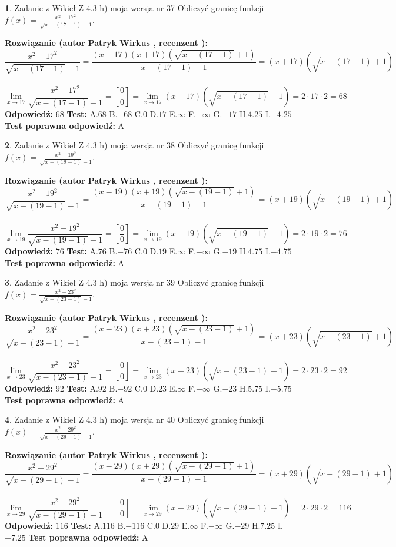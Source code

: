\documentclass[12pt, a4paper]{article}
\theoremstyle{definition} %
\newtheorem{zad}{}
\newcommand{\zadStart}[1]{\begin{zad}#1\newline}
\newcommand{\zadStop}{\end{zad}}
\newcommand{\rozwStart}[2]{\noindent \textbf{Rozwiązanie (autor #1 , recenzent #2): }\newline}
\newcommand{\rozwStop}{\newline}
\newcommand{\odpStart}{\noindent \textbf{Odpowiedź:}\newline}
\newcommand{\odpStop}{\newline}
\newcommand{\testStart}{\noindent \textbf{Test:}\newline}
\newcommand{\testStop}{\newline}
\newcommand{\kluczStart}{\noindent \textbf{Test poprawna odpowiedź:}\newline}
\newcommand{\kluczStop}{\newline}
\begin{document}
\zadStart{Zadanie z Wikieł Z 4.3 h) moja wersja nr 37}
Obliczyć granicę funkcji $f(x)=\frac{x^{2} - 17^{2}}{\sqrt{x-(17-1)}-1}$.
\zadStop
\rozwStart{Patryk Wirkus}{}
$$\frac{x^{2} - 17^{2}}{\sqrt{x-(17-1)}-1}=\frac{(x-17)(x+17)(\sqrt{x-(17-1)}+1)}{x-(17-1)-1}=(x+17)(\sqrt{x-(17-1)}+1)$$
\\
$$\lim\limits_{x\to 17}\frac{x^{2} - 17^{2}}{\sqrt{x-(17-1)}-1}=[\frac{0}{0}]=
\lim\limits_{x\to 17}(x+17)(\sqrt{x-(17-1)}+1) = 2\cdot17 \cdot 2 = 68$$
\rozwStop
\odpStart
$68$
\odpStop
\testStart
A.$68$
B.$-68$
C.$0$
D.$17$
E.$\infty$
F.$-\infty$
G.$-17$
H.$4.25$
I.$-4.25$
\testStop
\kluczStart
A
\kluczStop



\zadStart{Zadanie z Wikieł Z 4.3 h) moja wersja nr 38}
Obliczyć granicę funkcji $f(x)=\frac{x^{2} - 19^{2}}{\sqrt{x-(19-1)}-1}$.
\zadStop
\rozwStart{Patryk Wirkus}{}
$$\frac{x^{2} - 19^{2}}{\sqrt{x-(19-1)}-1}=\frac{(x-19)(x+19)(\sqrt{x-(19-1)}+1)}{x-(19-1)-1}=(x+19)(\sqrt{x-(19-1)}+1)$$
\\
$$\lim\limits_{x\to 19}\frac{x^{2} - 19^{2}}{\sqrt{x-(19-1)}-1}=[\frac{0}{0}]=
\lim\limits_{x\to 19}(x+19)(\sqrt{x-(19-1)}+1) = 2\cdot19 \cdot 2 = 76$$
\rozwStop
\odpStart
$76$
\odpStop
\testStart
A.$76$
B.$-76$
C.$0$
D.$19$
E.$\infty$
F.$-\infty$
G.$-19$
H.$4.75$
I.$-4.75$
\testStop
\kluczStart
A
\kluczStop



\zadStart{Zadanie z Wikieł Z 4.3 h) moja wersja nr 39}
Obliczyć granicę funkcji $f(x)=\frac{x^{2} - 23^{2}}{\sqrt{x-(23-1)}-1}$.
\zadStop
\rozwStart{Patryk Wirkus}{}
$$\frac{x^{2} - 23^{2}}{\sqrt{x-(23-1)}-1}=\frac{(x-23)(x+23)(\sqrt{x-(23-1)}+1)}{x-(23-1)-1}=(x+23)(\sqrt{x-(23-1)}+1)$$
\\
$$\lim\limits_{x\to 23}\frac{x^{2} - 23^{2}}{\sqrt{x-(23-1)}-1}=[\frac{0}{0}]=
\lim\limits_{x\to 23}(x+23)(\sqrt{x-(23-1)}+1) = 2\cdot23 \cdot 2 = 92$$
\rozwStop
\odpStart
$92$
\odpStop
\testStart
A.$92$
B.$-92$
C.$0$
D.$23$
E.$\infty$
F.$-\infty$
G.$-23$
H.$5.75$
I.$-5.75$
\testStop
\kluczStart
A
\kluczStop



\zadStart{Zadanie z Wikieł Z 4.3 h) moja wersja nr 40}
Obliczyć granicę funkcji $f(x)=\frac{x^{2} - 29^{2}}{\sqrt{x-(29-1)}-1}$.
\zadStop
\rozwStart{Patryk Wirkus}{}
$$\frac{x^{2} - 29^{2}}{\sqrt{x-(29-1)}-1}=\frac{(x-29)(x+29)(\sqrt{x-(29-1)}+1)}{x-(29-1)-1}=(x+29)(\sqrt{x-(29-1)}+1)$$
\\
$$\lim\limits_{x\to 29}\frac{x^{2} - 29^{2}}{\sqrt{x-(29-1)}-1}=[\frac{0}{0}]=
\lim\limits_{x\to 29}(x+29)(\sqrt{x-(29-1)}+1) = 2\cdot29 \cdot 2 = 116$$
\rozwStop
\odpStart
$116$
\odpStop
\testStart
A.$116$
B.$-116$
C.$0$
D.$29$
E.$\infty$
F.$-\infty$
G.$-29$
H.$7.25$
I.$-7.25$
\testStop
\kluczStart
A
\kluczStop
\end{document}
